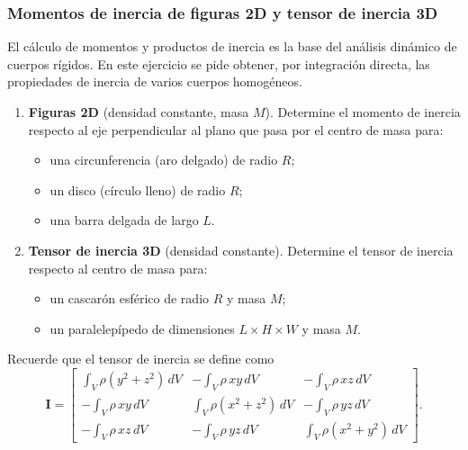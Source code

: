 \subsubsection{Momentos de inercia de figuras 2D y tensor de inercia 3D}

El cálculo de momentos y productos de inercia es la base del análisis dinámico de cuerpos
rígidos. En este ejercicio se pide obtener, por integración directa, las propiedades de
inercia de varios cuerpos homogéneos.

\begin{enumerate}
    \item \textbf{Figuras 2D} (densidad constante, masa $M$). Determine el momento de inercia
          respecto al eje perpendicular al plano que pasa por el centro de masa para:
          \begin{itemize}
              \item una circunferencia (aro delgado) de radio $R$;
              \item un disco (círculo lleno) de radio $R$;
              \item una barra delgada de largo $L$.
          \end{itemize}
    \item \textbf{Tensor de inercia 3D} (densidad constante). Determine el tensor de inercia
          respecto al centro de masa para:
          \begin{itemize}
              \item un cascarón esférico de radio $R$ y masa $M$;
              \item un paralelepípedo de dimensiones $L\times H\times W$ y masa $M$.
          \end{itemize}
\end{enumerate}

Recuerde que el tensor de inercia se define como
\[
\mathbf{I} =
\begin{bmatrix}
\displaystyle\int_V \rho(y^2 + z^2)\, dV & \displaystyle -\int_V \rho\, x y\, dV & \displaystyle -\int_V \rho\, x z\, dV \\[4pt]
\displaystyle -\int_V \rho\, x y\, dV & \displaystyle\int_V \rho(x^2 + z^2)\, dV & \displaystyle -\int_V \rho\, y z\, dV \\[4pt]
\displaystyle -\int_V \rho\, x z\, dV & \displaystyle -\int_V \rho\, y z\, dV & \displaystyle\int_V \rho(x^2 + y^2)\, dV
\end{bmatrix}.
\]

